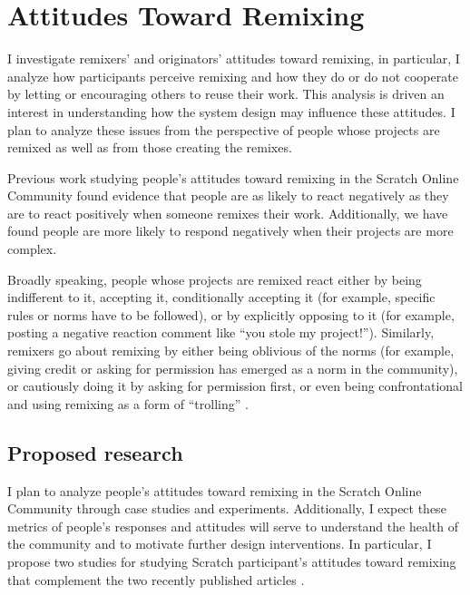 \section{Attitudes Toward Remixing}

I investigate remixers' and originators' attitudes toward remixing, in particular, I analyze how participants perceive remixing and how they do or do not cooperate by letting or encouraging others to reuse their work.
This analysis is driven an interest in understanding how the system design may influence these attitudes. 
I plan to analyze these issues from the perspective of people whose projects are remixed as well as from those creating the remixes.
 
Previous work studying people's attitudes toward remixing in the Scratch Online Community \citep{hill_responses_2010, monroy-hernandez_computers_2011} found evidence that people are as likely to react negatively as they are to react positively when someone remixes their work. 
Additionally, we have found people are more likely to respond negatively when their projects are more complex.

Broadly speaking, people whose projects are remixed react either by being indifferent to it, accepting it, conditionally accepting it (for example, specific rules or norms have to be followed), or by explicitly opposing to it (for example, posting a negative reaction comment like ``you stole my project!'').
Similarly, remixers go about remixing by either being oblivious of the norms (for example, giving credit or asking for permission has emerged as a norm in the  community), or cautiously doing it by asking for permission first, or even being confrontational and using remixing as a form of ``trolling'' \cite{donath_identity_1998}.

\subsection{Proposed research}

I plan to analyze people's attitudes toward remixing in the Scratch Online Community through case studies and experiments.
Additionally, I expect these metrics of people's responses and attitudes will serve to understand the health of the community and to motivate further design interventions.
In particular, I propose two studies for studying Scratch participant's attitudes toward remixing that complement the two recently published articles \citep{hill_responses_2010, monroy-hernandez_computers_2011}.



